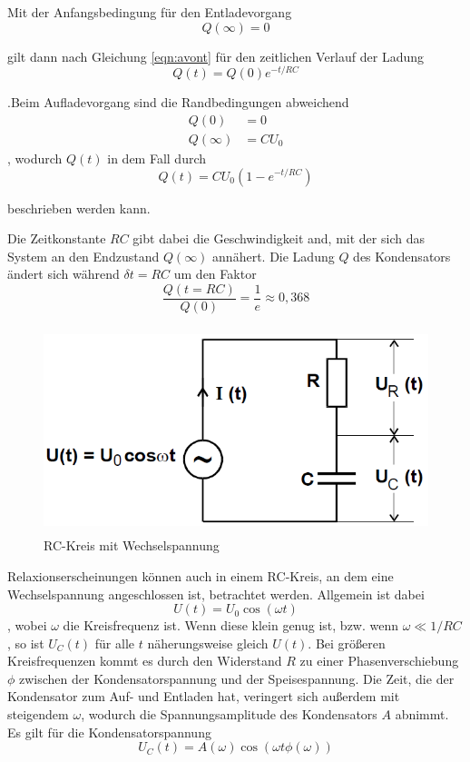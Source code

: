 Mit der Anfangsbedingung für den Entladevorgang
\begin{equation}
    Q(\infty) = 0
\end{equation}

gilt dann nach Gleichung \ref{eqn:avont} für den zeitlichen Verlauf der Ladung
\begin{equation}
    Q(t) = Q(0) e^{-t/{RC}}
\end{equation}

.Beim Aufladevorgang sind die Randbedingungen abweichend
\begin{align*}
    Q(0)        &= 0 \\
    Q(\infty)   &= CU_0 
\end{align*}, wodurch $Q(t)$ in dem Fall durch
\begin{equation}
    Q(t) = CU_0 (1 - e^{-t/{RC}})
    \label{eqn:RC}
\end{equation}

beschrieben werden kann.

Die Zeitkonstante $RC$ gibt dabei die Geschwindigkeit and, mit der sich das System 
an den Endzustand $Q(\infty)$ annähert. Die Ladung $Q$ des Kondensators ändert sich während $\delta t=RC$ um
den Faktor
\begin{equation*}
    \frac{Q(t=RC)}{Q(0)} = \frac{1}e \approx 0,368 
\end{equation*} 


\begin{figure}
    \centering
    \includegraphics[height=6cm]{data/bild_2}
    \caption{RC-Kreis mit Wechselspannung}
    \label{fig:bild_2}
\end{figure}
\FloatBarrier
Relaxionserscheinungen können auch in einem RC-Kreis, an dem eine Wechselspannung angeschlossen ist, betrachtet werden. 
Allgemein ist dabei \begin{equation}
    U(t) = U_0 \cos(\omega t)
\end{equation}, wobei $\omega$ die Kreisfrequenz ist. Wenn diese klein genug ist, bzw. wenn $\omega \ll 1/RC$, so ist $U_C (t)$
für alle $t$ näherungsweise gleich $U(t)$. Bei größeren Kreisfrequenzen kommt es durch den Widerstand $R$ zu einer Phasenverschiebung
$\phi$ zwischen der Kondensatorspannung und der Speisespannung. Die Zeit, die der Kondensator zum Auf- und Entladen hat, veringert sich 
außerdem mit steigendem $\omega$, wodurch die Spannungsamplitude des Kondensators $A$ abnimmt. Es gilt für die Kondensatorspannung 
\begin{equation}
    U_C (t) = A(\omega) \cos(\omega t \phi(\omega))
\end{equation}

